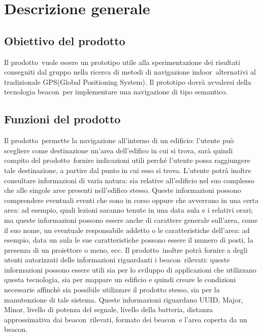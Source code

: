 \documentclass[../AnalisiDeiRequisiti.tex]{subfiles}
\begin{document}
\section{Descrizione generale}
	\subsection{Obiettivo del prodotto}
	Il prodotto\g\ vuole essere un prototipo utile alla sperimentazione dei risultati conseguiti dal gruppo nella ricerca di metodi di navigazione indoor\g\ alternativi al tradizionale GPS(Global Positioning System).
Il prototipo dovrà avvalersi della tecnologia beacon\g\ per implementare una navigazione di tipo semantico.

	\subsection{Funzioni del prodotto}
	Il prodotto\g\ permette la navigazione all'interno di un edificio: l'utente può scegliere come destinazione un'area dell'edifico in cui si trova, sarà quindi compito del prodotto\g\ fornire indicazioni utili perché l'utente possa raggiungere tale destinazione, a partire dal punto in cui esso si trova. L'utente potrà inoltre consultare informazioni di varia natura: sia relative all'edificio nel suo complesso che alle singole aree presenti nell'edifico stesso. Queste informazioni possono comprendere eventuali eventi che sono in corso oppure che avverrano in una certa area: ad esempio, quali lezioni saranno tenute in una data aula e i relativi orari; ma queste informazioni possono essere anche di carattere generale sull'area, come il suo nome, un eventuale responsabile addetto o le caratteristiche dell'area: ad esempio, data un aula le sue caratteristiche possono essere il numero di posti, la presenza di un proiettore o meno, ecc. Il prodotto\g\ inoltre potrà fornire a degli utenti autorizzati delle informazioni riguardanti i beacon\g\ rilevati: queste informazioni possono essere utili sia per lo sviluppo di applicazioni che utilizzano questa tecnologia, sia per mappare un edificio e quindi creare le condizioni necessarie affinchè sia possibile utilizzare il prodotto stesso, sia per la manutenzione di tale sistema. Queste informazioni riguardano UUID, Major, Minor, livello di potenza del segnale, livello della batteria, distanza approssimativa dai beacon\g\ rilevati, formato dei beacon\g\ e l'area coperta da un beacon\g.
		
\end{document}
